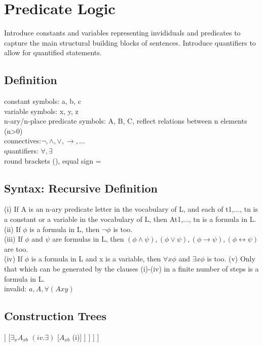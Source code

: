 \section{Predicate Logic}
{\tiny Introduce constants and variables representing invididuals and predicates to capture the main structural building blocks of sentences. Introduce quantifiers to allow for quantified statements.}
\subsection*{Definition}
{\tiny constant symbols: a, b, c\\
variable symbols: x, y, z\\
n-ary/n-place predicate symbols: A, B, C, reflect relations between n elements (n>0)\\
connectives:$\neg, \land, \lor, \to, ...$ \\
quantifiers: $\forall, \exists$ \\
round brackets (), equal sign =}
\subsection*{Syntax: Recursive Definition}
{\scriptsize (i) If A is an n-ary predicate letter in the vocabulary of L, and each of t1,..., tn is a constant or a variable in the vocabulary of L, then At1,..., tn is a formula in L.\\
(ii) If $\phi$ is a formula in L, then $\neg \phi$ is too.\\
(iii) If $\phi$ and $\psi$ are formulas in L, then $(\phi \land \psi), (\phi \lor \psi), (\phi \to \psi), (\phi \leftrightarrow \psi)$ are too.\\
(iv) If $\phi$ is a formula in L and x is a variable, then $\forall x \phi$ and $\exists x \phi$ is too.
(v) Only that which can be generated by the clauses (i)-(iv) in a finite
number of steps is a formula in L.}\\
invalid: $a, A, \forall(Axy)$ 
\subsection*{Construction Trees}
\begin{forest}
[$\forall_x \forall_y ((A_{xy} \land B_y) \to \exists_x A_{xb})$ $(iv. \forall)$
	[$\forall_y ((A_{xy} \land B_y) \to \exists_x A_{xb})$ $(iv. \forall)$
		[$(A_{xy} \land B_y) \to \exists_x A_{xb}$ $(iii. \to)$
			[$A_{xy} \land B_y$ $(iii. \land)$
				[$A_{xy}$ (i)]
				[$B_y$ (i)]
			]
			[$\exists_x A_{xb}$ $(iv. \exists)$
				[$A_{xb}$ (i)]
			]
		]
	]
]
\end{forest}
